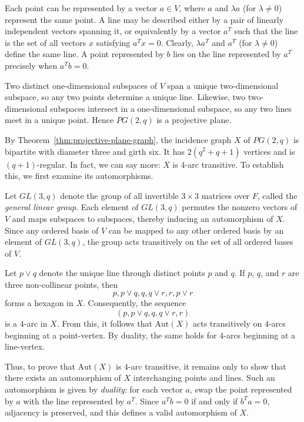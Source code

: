\documentclass[12pt,a4paper,openany]{book}
\begin{document}
Each point can be represented by a vector $a \in V$, where $a$ and $\lambda a$ (for $\lambda \neq 0$) represent the same point. A line may be described either by a pair of linearly independent vectors spanning it, or equivalently by a vector $a^T$ such that the line is the set of all vectors $x$ satisfying $a^T x = 0$. Clearly, $\lambda a^T$ and $a^T$ (for $\lambda \neq 0$) define the same line. A point represented by $b$ lies on the line represented by $a^T$ precisely when $a^T b = 0$.  

Two distinct one-dimensional subspaces of $V$ span a unique two-dimensional subspace, so any two points determine a unique line. Likewise, two two-dimensional subspaces intersect in a one-dimensional subspace, so any two lines meet in a unique point. Hence $PG(2,q)$ is a projective plane.  

By Theorem~\ref{thm:projective-plane-graph}, the incidence graph $X$ of $PG(2,q)$ is bipartite with diameter three and girth six. It has $2(q^2 + q + 1)$ vertices and is $(q+1)$-regular. In fact, we can say more: $X$ is $4$-arc transitive. To establish this, we first examine its automorphisms.  

Let $GL(3,q)$ denote the group of all invertible $3 \times 3$ matrices over $F$, called the \emph{general linear group}. Each element of $GL(3,q)$ permutes the nonzero vectors of $V$ and maps subspaces to subspaces, thereby inducing an automorphism of $X$. Since any ordered basis of $V$ can be mapped to any other ordered basis by an element of $GL(3,q)$, the group acts transitively on the set of all ordered bases of $V$.  

Let $p \vee q$ denote the unique line through distinct points $p$ and $q$. If $p$, $q$, and $r$ are three non-collinear points, then
\[
p,  p \vee q,  q,  q \vee r,  r,  p \vee r
\]
forms a hexagon in $X$. Consequently, the sequence
\[
(p,  p \vee q,  q,  q \vee r,  r)
\]
is a $4$-arc in $X$. From this, it follows that $\mathrm{Aut}(X)$ acts transitively on $4$-arcs beginning at a point-vertex. By duality, the same holds for $4$-arcs beginning at a line-vertex.  

Thus, to prove that $\mathrm{Aut}(X)$ is $4$-arc transitive, it remains only to show that there exists an automorphism of $X$ interchanging points and lines. Such an automorphism is given by \emph{duality}: for each vector $a$, swap the point represented by $a$ with the line represented by $a^T$. Since $a^T b = 0$ if and only if $b^T a = 0$, adjacency is preserved, and this defines a valid automorphism of $X$.  
\end{document}
